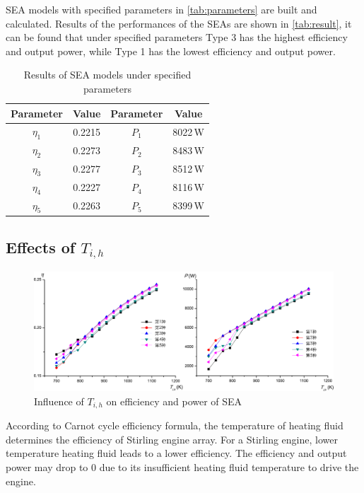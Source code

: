 SEA models with specified parameters in \autoref{tab:parameters} are built and calculated. Results of the performances of the SEAs are shown in \autoref{tab:result}, it can be found that under specified parameters Type 3 has the highest efficiency and output power, while Type 1 has the lowest efficiency and output power.

\begin{table}[htbp]
	\caption{Results of SEA models under specified parameters}
	\centering
	\begin{tabular}{cccc}
		\toprule
		Parameter		&	Value	&	Parameter		&	Value\\
		\midrule
		$\eta_1$	&	0.2215	&	$P_1$		&	8022\,W\\
		$\eta_2$	&	0.2273	&	$P_2$		&	8483\,W\\
		$\eta_3$	&	0.2277	&	$P_3$		&	8512\,W\\
		$\eta_4$	&	0.2227	&	$P_4$		&	8116\,W\\
		$\eta_5$	&	0.2263	&	$P_5$		&	8399\,W\\		
		\bottomrule
	\end{tabular}
	\label{tab:result}
\end{table}

\subsection{Effects of $T_{i,h}$}

\begin{figure}[htpb]
\centering
	\includegraphics[width = 0.9\columnwidth]{fig/T_ih}
	\caption{Influence of $T_{i,h}$ on efficiency and power of SEA}
	\label{fig:Ti_h}
\end{figure}
According to Carnot cycle efficiency formula, the temperature of heating fluid determines the efficiency of Stirling engine array. For a Stirling engine, lower temperature heating fluid leads to a lower efficiency. The efficiency and output power may drop to 0 due to its insufficient heating fluid temperature to drive the engine.

